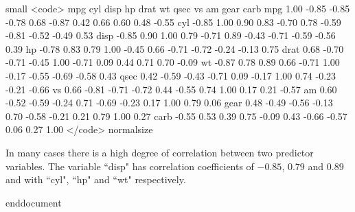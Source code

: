 small
<code>
       mpg   cyl  disp    hp  drat    wt  qsec    vs    am  gear  carb
mpg   1.00 -0.85 -0.85 -0.78  0.68 -0.87  0.42  0.66  0.60  0.48 -0.55
cyl  -0.85  1.00  0.90  0.83 -0.70  0.78 -0.59 -0.81 -0.52 -0.49  0.53
disp -0.85  0.90  1.00  0.79 -0.71  0.89 -0.43 -0.71 -0.59 -0.56  0.39
hp   -0.78  0.83  0.79  1.00 -0.45  0.66 -0.71 -0.72 -0.24 -0.13  0.75
drat  0.68 -0.70 -0.71 -0.45  1.00 -0.71  0.09  0.44  0.71  0.70 -0.09
wt   -0.87  0.78  0.89  0.66 -0.71  1.00 -0.17 -0.55 -0.69 -0.58  0.43
qsec  0.42 -0.59 -0.43 -0.71  0.09 -0.17  1.00  0.74 -0.23 -0.21 -0.66
vs    0.66 -0.81 -0.71 -0.72  0.44 -0.55  0.74  1.00  0.17  0.21 -0.57
am    0.60 -0.52 -0.59 -0.24  0.71 -0.69 -0.23  0.17  1.00  0.79  0.06
gear  0.48 -0.49 -0.56 -0.13  0.70 -0.58 -0.21  0.21  0.79  1.00  0.27
carb -0.55  0.53  0.39  0.75 -0.09  0.43 -0.66 -0.57  0.06  0.27  1.00
</code>
normalsize

In many cases there is a high degree of correlation between two predictor variables. The variable ``disp" has correlation coefficients of $-0.85$, $0.79$ and $0.89$ and with ``cyl", ``hp" and ``wt" respectively.

end{document}
